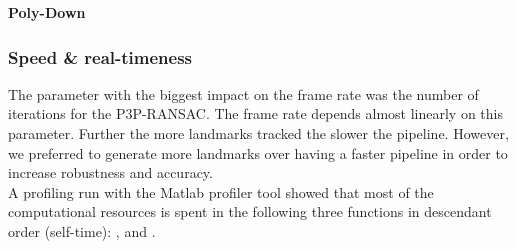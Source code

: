\textbf{Poly-Down}

\subsubsection{Speed \& real-timeness}
The parameter with the biggest impact on the frame rate was the number of iterations for the P3P-RANSAC. The frame rate depends almost linearly on this parameter. Further the more landmarks tracked the slower the pipeline. However, we preferred to generate more landmarks over having a faster pipeline in order to increase robustness and accuracy.\\

A profiling run with the Matlab profiler tool showed that most of the computational resources is spent in the following three functions in descendant order (self-time): ,  and .

